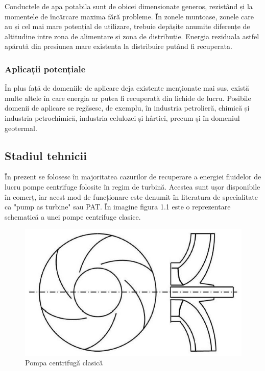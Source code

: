 Conductele de apa potabila sunt de obicei dimensionate generos, rezistând și la momentele de încărcare maxima fără probleme. În zonele muntoase, zonele care au și cel mai mare potențial de utilizare, trebuie depășite anumite diferențe de altitudine intre zona de alimentare și zona de distribuție. Energia reziduala astfel apărută din presiunea mare existenta la distribuire putând fi recuperata.


\subsubsection{Aplicații potențiale}

În plus față de domeniile de aplicare deja existente menționate mai sus, există multe altele în care energia ar putea fi recuperată din lichide de lucru. Posibile domenii de aplicare se regăsesc, de exemplu, în industria petrolieră, chimică și industria petrochimică, industria celulozei și hârtiei, precum și în domeniul geotermal.


\subsection{Stadiul tehnicii}

În prezent se folosesc în majoritatea cazurilor de recuperare a energiei fluidelor de lucru pompe centrifuge folosite în regim de turbină. Acestea sunt ușor disponibile în comerț, iar acest mod de funcționare este denumit în literatura de specialitate ca "pump as turbine" sau PAT. În imagine figura 1.1 este o reprezentare schematică a unei pompe centrifuge clasice.

\begin{figure}[h!]
	\centering
	\includegraphics[scale=0.7]{figures/centrifugal-pump.jpg}
	\caption{Pompa centrifugă clasică \protect\cite{neipp2017zweistufige}}
	\label{Pompa centrifugă clasică \u{a}}
\end{figure}

